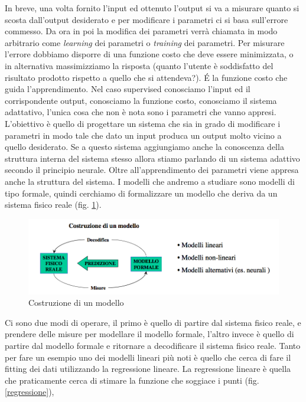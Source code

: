In breve, una volta fornito l'input ed ottenuto l'output si va a misurare quanto si scosta dall'output desiderato e per modificare i parametri ci si basa sull'errore commesso.  Da ora in poi la modifica dei parametri verrà chiamata in modo arbitrario come \emph{learning} dei parametri o \emph{training} dei parametri. Per misurare l'errore dobbiamo disporre di una funzione costo che deve essere minimizzata, o in alternativa massimizziamo la risposta (quanto l'utente è soddisfatto del risultato prodotto rispetto a quello che si attendeva?). \'E la funzione costo che guida l'apprendimento. Nel caso supervised conosciamo l'input ed il corrispondente output, conosciamo la funzione costo, conosciamo il sistema adattativo, l'unica cosa che non è nota sono i parametri che vanno appresi. L'obiettivo è quello di progettare un sistema che sia in grado di modificare i parametri in modo tale che dato un input produca un output molto vicino a quello desiderato. Se a questo sistema aggiungiamo anche la conoscenza della struttura interna del sistema stesso allora stiamo parlando di un sistema adattivo secondo il principio neurale. Oltre all'apprendimento dei parametri viene appresa anche la struttura del sistema.  I modelli che andremo a studiare sono modelli di tipo formale, quindi cerchiamo di formalizzare un modello che deriva da un sistema fisico reale (fig. \ref{modello}). 
\begin{figure}
\centering
\includegraphics[scale=0.5]{img/modello.png}
\caption{Costruzione di un modello}
\label{modello}
\end{figure}
Ci sono due modi di operare, il primo è quello di partire dal sistema fisico reale, e prendere delle misure per modellare il modello formale, l'altro invece è quello di partire dal modello formale e ritornare a decodificare il sistema fisico reale. Tanto per fare un esempio uno dei modelli lineari più noti è quello che cerca di fare il fitting dei dati utilizzando la regressione lineare. La regressione lineare è quella che praticamente cerca di stimare la funzione che soggiace i punti (fig. \ref{regressione}),
